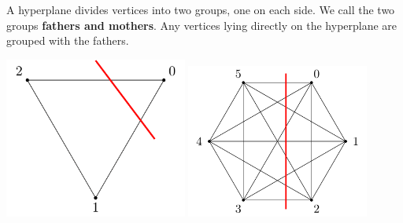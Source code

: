 \documentclass[a0paper,landscape,final]{baposter}
\begin{document}
\begin{poster}
{A hyperplane divides vertices into two groups, one on each side.
We call the two groups \textbf{fathers and mothers}.
Any vertices lying directly on the hyperplane are grouped with the fathers.
\begin{center}
	\includegraphics[width=0.45\textwidth]{FIG/TIKZ_SimplexFLAT_20230415/TIKZ_SimplexFlat_20230415-2.png}
	\includegraphics[width=0.45\textwidth]{FIG/TIKZ_SimplexFLAT_20230415/TIKZ_SimplexFlat_20230415-5.png}
\end{center}

}
\end{poster}
\end{document}
